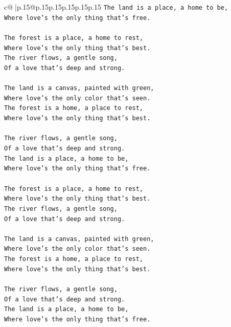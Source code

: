\documentclass{article}
\begin{document}
{\begin{supertabular}{c@{$\;$}|p{.15\linewidth}@{}p{.15\linewidth}p{.15\linewidth}p{.15\linewidth}p{.15\linewidth}p{.15\linewidth}}
{{{\texttt{The land is a place, a home to be,} \\
\texttt{Where love's the only thing that's free.} \\
\\ 
\texttt{The forest is a place, a home to rest,} \\
\texttt{Where love's the only thing that's best.} \\
\texttt{The river flows, a gentle song,} \\
\texttt{Of a love that's deep and strong.} \\
\\ 
\texttt{The land is a canvas, painted with green,} \\
\texttt{Where love's the only color that's seen.} \\
\texttt{The forest is a home, a place to rest,} \\
\texttt{Where love's the only thing that's best.} \\
\\ 
\texttt{The river flows, a gentle song,} \\
\texttt{Of a love that's deep and strong.} \\
\texttt{The land is a place, a home to be,} \\
\texttt{Where love's the only thing that's free.} \\
\\ 
\texttt{The forest is a place, a home to rest,} \\
\texttt{Where love's the only thing that's best.} \\
\texttt{The river flows, a gentle song,} \\
\texttt{Of a love that's deep and strong.} \\
\\ 
\texttt{The land is a canvas, painted with green,} \\
\texttt{Where love's the only color that's seen.} \\
\texttt{The forest is a home, a place to rest,} \\
\texttt{Where love's the only thing that's best.} \\
\\ 
\texttt{The river flows, a gentle song,} \\
\texttt{Of a love that's deep and strong.} \\
\texttt{The land is a place, a home to be,} \\
\texttt{Where love's the only thing that's free.} \\
\\ 
}}}
\end{supertabular}}
\end{document}
